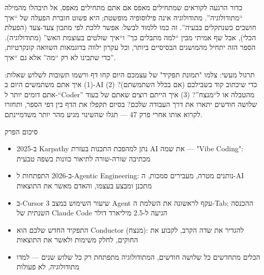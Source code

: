 \begin{tcbinfo}{כדור הרגעה לקוראים שמתחילים מאפס}
אם אתם מתחילים מאפס, אל תיבהלו מהמילה “מתודולוגיה”. מתודולוגיה אינה פילוסופיה מופשטת; היא פשוט חוברת הפעלה של “איך חושבים כשנתקלים בבעיה”. זה כמו ללמוד לבשל: אפשר ללכת לפי מתכון צעד-צעד (הפעלת הכלי), אבל שף אמיתי מבין “למה מתבלים כך” ו“איך שולטים בעוצמת האש” (מתודולוגיה). הספר הזה יתחיל מהמושגים הבסיסיים ביותר, וכל עקרון ילווה בדוגמאות השוואה קונקרטיות, כדי שתבינו לא רק “מה” אלא גם “איך”.

\end{tcbinfo}

\begin{tcbpractice}{תרגול מעשי: צלמו "תמונת תפקיד" של עצמכם היום}
קחו דף ורשמו תשובות לשלוש שאלות: (1) איך אתם משתמשים היום ב-AI כדי שיכתוב קוד בשבילכם (אם בכלל השתמשתם)? (2) אתם דומים יותר ל-“Coder” מהטבלה או ל“מנצח”? (3) איך הייתם רוצים שאתם של בעוד שלושה חודשים יתארו את דרך העבודה שלכם? בסיום תקפלו את הדף בין דפי הספר, ותחזרו לקרוא אותו אחרי פרק 47 — תגלו שהשינוי מגיע מהר יותר משדמיינתם.

\end{tcbpractice}

\begin{tcbsummary}{סיכום הפרק}
\begin{itemize}
  \item ב-2025 Karpathy נתן למהפכת התכנות בעזרת AI את שמה — "Vibe Coding": מכתיבה שורה-שורה לתיאור כוונות בשפה טבעית
  \item ב-2026 התפתחות ל-Agentic Engineering: נותנים מטרה, מעבירים סמכות, ה-AI מתכנן ומבצע בעצמו, והאדם מאשר את התוצאות
  \item ב-Cursor 3 שיעור השימוש במצב Agent עקף לראשונה את השלמת ה-Tab; ההכנסה השנתית של Claude Code הגיעה ל-2.5 מיליארד דולר
  \item התפקיד החדש שלכם הוא Conductor (מנצח): להגדיר את שדה הקרב, לקבוע את החוקים, לחלק משימות ולאשר את התוצאות
  \item הכלים מתחדשים כל שלושה חודשים, המתודולוגיה מתפתחת רק כל שלוש שנים — למדו מתודולוגיה, לא פעולות
\end{itemize}

\end{tcbsummary}
